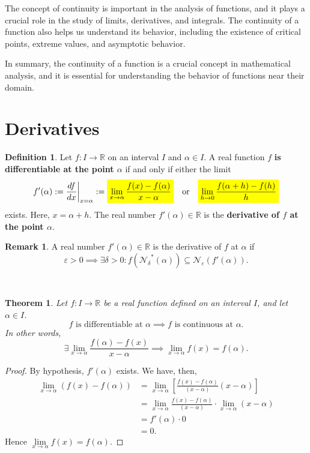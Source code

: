 \documentclass[12pt,openany]{book}
\newcommand{\mathcolorbox}[2]{\colorbox{#1}{$\displaystyle #2$}}
\newtheorem{theorem}{Theorem}
\theoremstyle{definition}
\newtheorem{definition}{Definition}
\newtheorem{remark}{Remark}
\newcommand{\R}{\mathbb{R}}
\newcommand{\nbhd}{\mathcal{N}}
\begin{document}
	The concept of continuity is important in the analysis of functions, and it plays a crucial role in the study of limits, derivatives, and integrals. The continuity of a function also helps us understand its behavior, including the existence of critical points, extreme values, and asymptotic behavior.
	
	In summary, the continuity of a function is a crucial concept in mathematical analysis, and it is essential for understanding the behavior of functions near their domain.
	
	\newpage
	\section{Derivatives}
	\begin{tcolorbox}[title=Differentaible Mapping]
		\begin{definition}
			Let $f:I\to\R$ on an interval $I$ and $\alpha\in I$. A real function $f$ \textbf{is differentiable at the point $\alpha$} if and only if either the limit \[
			f'(\alpha):=\frac{df}{dx}\bigg|_{x=\alpha}:=\mathcolorbox{-blue}{\lim_{x\to\alpha}\frac{f(x)-f(\alpha)}{x-\alpha}}\quad\text{or}\quad \mathcolorbox{-blue}{\lim_{h\to0}\frac{f(\alpha+h)-f(h)}{h}}
			\] exists. Here, $x=\alpha+h$. The real number $f'(\alpha)\in\R$ is the \textbf{derivative of $f$ at the point $\alpha$}.
		\end{definition}
	\end{tcolorbox} 
	\begin{remark}
		A real number $f'(\alpha)\in\R$ is the derivative of $f$ at $\alpha$ if \[
		\varepsilon>0\implies\exists\delta>0: f\left({\nbhd_\delta}^*(\alpha)\right)\subseteq \nbhd_\varepsilon\left(f'(\alpha)\right).
		\]
	\end{remark}
	\
	\begin{tcolorbox}[colback=white]
		\begin{theorem}
			Let $f:I\to\R$ be a real function defined on an interval $I$, and let $\alpha\in I$. \[
			\text{$f$ is differentiable at $\alpha$}\implies\text{$f$ is continuous at $\alpha$}.
			\] In other words, \[
			\exists\lim_{x\to\alpha}\frac{f(\alpha)-f(x)}{x-\alpha}\implies\lim_{x\to\alpha}f(x)=f(\alpha).
			\]
		\end{theorem}
	\end{tcolorbox}
	\begin{proof}
		By hypothesis, $f'(\alpha)$ exists. We have, then, \begin{align*}
			\lim_{x\to\alpha}\left(f(x)-f(\alpha)\right)&=\lim_{x\to\alpha}\left[\frac{f(x)-f(\alpha)}{(x-\alpha)}(x-\alpha)\right]\\
			&=\lim_{x\to\alpha}\frac{f(x)-f(\alpha)}{(x-\alpha)}\cdot\lim_{x\to\alpha}(x-\alpha)\\
			&=f'(\alpha)\cdot0\\
			&=0.
		\end{align*} Hence $\lim\limits_{x\to\alpha}f(x)=f(\alpha)$.
	\end{proof}
	
\end{document}
